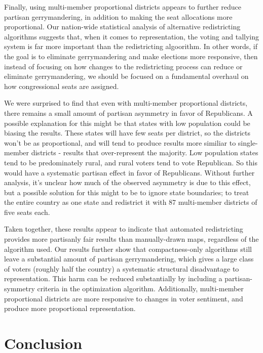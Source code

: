 \documentclass[preprint,12pt]{article}
\begin{document}
Finally, using multi-member proportional districts appears to further reduce partisan gerrymandering, in addition to making the seat allocations more proportional.  Our nation-wide statistical analysis of alternative redistricting algorithms suggests that, when it comes to representation, the voting and tallying system is far more important than the redistricting algoorithm.  In other words, if the goal is to eliminate gerrymandering and make elections more responsive, then instead of focusing on how changes to the redistricting process can reduce or eliminate gerrymandering, we should be focused on a fundamental overhaul on how congressional seats are assigned.

We were surprised to find that even with multi-member proportional districts, there remains a small amount of partisan asymmetry in favor of Republicans.
A possible explanation for this might be that states with low population could be biasing the results.
These states will have few seats per district, so the districts won't be as proportional, and will tend to produce results more similiar to single-member districts - results that over-represent the majority.
Low population states tend to be predominately rural, and rural voters tend to vote Republican.  So this would have a systematic partisan effect in favor of Republicans.
Without further analysis, it's unclear how much of the observed asymmetry is due to this effect, but a possible solution for this might to be to ignore state boundaries; to treat the entire country as one state and redistrict it with 87 multi-member districts of five seats each.

Taken together, these results appear to indicate that automated redistricting provides more partisanly fair results than manually-drawn maps, regardless of the algorithm used.  Our results further show that compactness-only algorithms still leave a substantial amount of partisan gerrymandering, which gives a large class of voters (roughly half the country) a systematic structural disadvantage to representation.  This harm can be reduced substantially by including a partisan-symmetry criteria in the optimization algorithm.  Additionally, multi-member proportional districts are more responsive to changes in voter sentiment, and produce more proportional representation.

\section{Conclusion}
\end{document}

